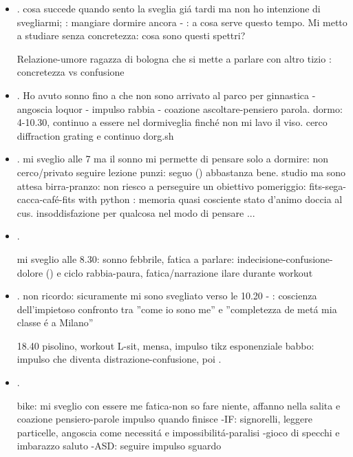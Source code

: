 \begin{itemize}
\item {}.
cosa succede quando sento la sveglia gi\'a tardi ma non ho intenzione di svegliarmi; : mangiare dormire ancora - : a cosa serve questo tempo.
Mi metto a studiare senza concretezza: cosa sono questi spettri?

Relazione-umore ragazza di bologna che si mette a parlare con altro tizio
: concretezza vs confusione

\item {}.
Ho avuto sonno fino a che non sono arrivato al parco per ginnastica - angoscia loquor - impulso rabbia - coazione ascoltare-pensiero parola.
dormo: 4-10.30, continuo a essere nel dormiveglia finch\'e non mi lavo il viso.
cerco diffraction grating e continuo dorg.sh

\item {}.
mi sveglio alle 7 ma il sonno mi permette di pensare solo a dormire: non cerco/privato
seguire lezione punzi: seguo () abbastanza bene.
studio ma sono attesa birra-pranzo: non riesco a perseguire un obiettivo 
pomeriggio: fits-sega-cacca-caf\'e-fits with python
: memoria quasi cosciente stato d'animo doccia al cus.
insoddisfazione per qualcosa nel modo di pensare ...

\item {}.

mi sveglio alle 8.30: sonno febbrile, fatica a parlare: indecisione-confusione-dolore () e ciclo rabbia-paura,
fatica/narrazione ilare durante workout

\item {}.
non ricordo: sicuramente mi sono svegliato verso le 10.20 - : coscienza dell'impietoso confronto tra ''come io sono me'' e ''completezza de met\'a mia classe \'e a Milano''

18.40 pisolino, workout L-sit, mensa, impulso tikz esponenziale babbo: impulso che diventa distrazione-confusione, poi .

\item {}.

bike: mi sveglio con essere me fatica-non so fare niente, affanno nella salita e coazione pensiero-parole impulso quando finisce
-IF: signorelli, leggere particelle, angoscia come necessit\'a e impossibilit\'a-paralisi
-gioco di specchi e imbarazzo saluto
-ASD: seguire impulso sguardo 


\end{itemize}
